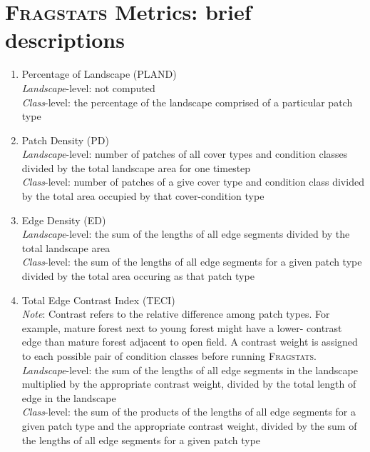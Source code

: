 \chapter{\textsc{Fragstats} Metrics: brief descriptions}
\label{app:metricdescriptions}
\begin{enumerate}
	\item Percentage of Landscape (PLAND)\\
	\emph{Landscape}-level: not computed\\
	\emph{Class}-level: the percentage of the landscape comprised of a particular patch type\\
	
	\item Patch Density (PD)\\
	\emph{Landscape}-level: number of patches of all cover types and condition classes divided by the total landscape area for one timestep\\
	\emph{Class}-level: number of patches of a give cover type and condition class divided by the total area occupied by that cover-condition type
\\
	
	\item Edge Density (ED) \\
	\label{item:ED}
	\emph{Landscape}-level: the sum of the lengths of all edge segments divided by the total landscape area\\	
	\emph{Class}-level: the sum of the lengths of all edge segments for a given patch type divided by the total area occuring as that patch type\\
	\item Total Edge Contrast Index (TECI) \\
	\label{item:TECI}
	\emph{Note}: Contrast refers to the relative difference among patch types. For example, mature forest next to young forest might have a lower-
contrast edge than mature forest adjacent to open field. A contrast weight is assigned to each possible pair of condition classes before 
running \textsc{Fragstats}. 	\\
	\emph{Landscape}-level: the sum of the lengths of all edge segments in the landscape multiplied by the appropriate contrast weight, divided by 
the total length of edge in the landscape\\
	\emph{Class}-level: the sum of the products of the lengths of all edge segments for a given patch type and the appropriate contrast weight, 
divided by the sum of the lengths of all edge segments for a given patch type \\
	

\end{enumerate}

